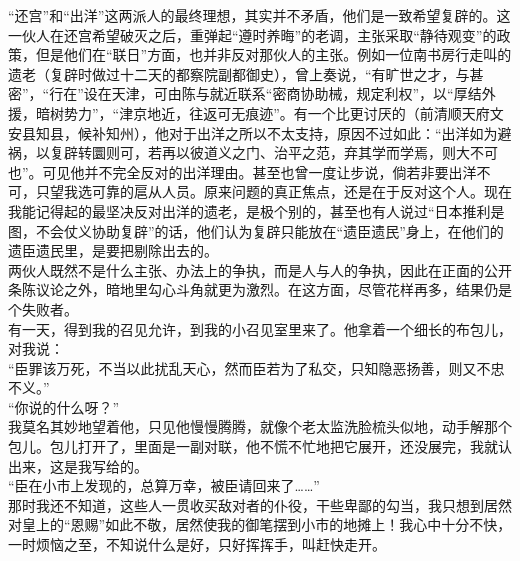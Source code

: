 “还宫”和“出洋”这两派人的最终理想，其实并不矛盾，他们是一致希望复辟的。这一伙人在还宫希望破灭之后，重弹起“遵时养晦”的老调，主张采取“静待观变”的政策，但是他们在“联日”方面，也并非反对那伙人的主张。例如一位南书房行走叫的遗老（复辟时做过十二天的都察院副都御史），曾上奏说，“有旷世之才，与甚密”，“行在”设在天津，可由陈与就近联系“密商协助械，规定利权”，以“厚结外援，暗树势力”，“津京地近，往返可无痕迹”。有一个比更讨厌的（前清顺天府文安县知县，候补知州），他对于出洋之所以不太支持，原因不过如此：“出洋如为避祸，以复辟转圜则可，若再以彼道义之门、治平之范，弃其学而学焉，则大不可也”。可见他并不完全反对的出洋理由。甚至也曾一度让步说，倘若非要出洋不可，只望我选可靠的扈从人员。原来问题的真正焦点，还是在于反对这个人。现在我能记得起的最坚决反对出洋的遗老，是极个别的，甚至也有人说过“日本推利是图，不会仗义协助复辟”的话，他们认为复辟只能放在“遗臣遗民”身上，在他们的遗臣遗民里，是要把剔除出去的。\\

两伙人既然不是什么主张、办法上的争执，而是人与人的争执，因此在正面的公开条陈议论之外，暗地里勾心斗角就更为激烈。在这方面，尽管花样再多，结果仍是个失败者。\\

有一天，得到我的召见允许，到我的小召见室里来了。他拿着一个细长的布包儿，对我说：\\

“臣罪该万死，不当以此扰乱天心，然而臣若为了私交，只知隐恶扬善，则又不忠不义。”\\

“你说的什么呀？”\\

我莫名其妙地望着他，只见他慢慢腾腾，就像个老太监洗脸梳头似地，动手解那个包儿。包儿打开了，里面是一副对联，他不慌不忙地把它展开，还没展完，我就认出来，这是我写给的。\\

“臣在小市上发现的，总算万幸，被臣请回来了……”\\

那时我还不知道，这些人一贯收买敌对者的仆役，干些卑鄙的勾当，我只想到居然对皇上的“恩赐”如此不敬，居然使我的御笔摆到小市的地摊上！我心中十分不快，一时烦恼之至，不知说什么是好，只好挥挥手，叫赶快走开。\\

